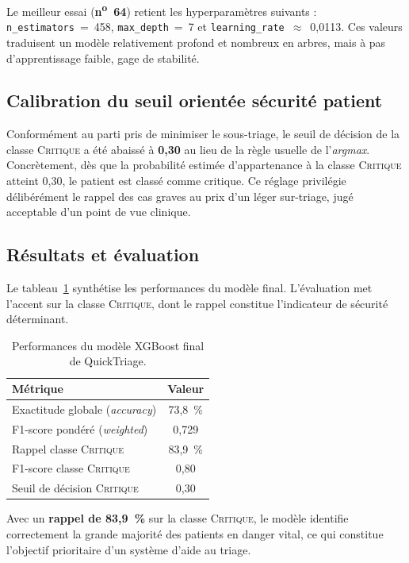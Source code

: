 \noindent Le meilleur essai (\textbf{n\textsuperscript{o}~64}) retient les hyperparamètres
suivants : \texttt{n\_estimators}~=~458, \texttt{max\_depth}~=~7 et
\texttt{learning\_rate}~$\approx$~0,0113. Ces valeurs traduisent un modèle relativement profond et
nombreux en arbres, mais à pas d'apprentissage faible, gage de stabilité.

\subsection{Calibration du seuil orientée sécurité patient}
Conformément au parti pris de minimiser le sous-triage, le seuil de décision de la classe
\textsc{Critique} a été abaissé à \textbf{0,30} au lieu de la règle usuelle de l'\textit{argmax}.
Concrètement, dès que la probabilité estimée d'appartenance à la classe \textsc{Critique} atteint
0,30, le patient est classé comme critique. Ce réglage privilégie délibérément le rappel des cas
graves au prix d'un léger sur-triage, jugé acceptable d'un point de vue clinique.

\subsection{Résultats et évaluation}
Le tableau~\ref{tab:metrics} synthétise les performances du modèle final. L'évaluation met
l'accent sur la classe \textsc{Critique}, dont le rappel constitue l'indicateur de sécurité
déterminant.

\begin{table}[h]
\centering
\renewcommand{\arraystretch}{1.35}
\begin{tabular}{p{6cm} c}
\toprule
\textbf{Métrique} & \textbf{Valeur} \\
\midrule
Exactitude globale (\textit{accuracy}) & 73,8~\% \\
F1-score pondéré (\textit{weighted}) & 0,729 \\
Rappel classe \textsc{Critique} & 83,9~\% \\
F1-score classe \textsc{Critique} & 0,80 \\
Seuil de décision \textsc{Critique} & 0,30 \\
\bottomrule
\end{tabular}
\caption{Performances du modèle XGBoost final de QuickTriage.}
\label{tab:metrics}
\end{table}

\begin{successbox}
Avec un \textbf{rappel de 83,9~\%} sur la classe \textsc{Critique}, le modèle identifie
correctement la grande majorité des patients en danger vital, ce qui constitue l'objectif
prioritaire d'un système d'aide au triage.
\end{successbox}

